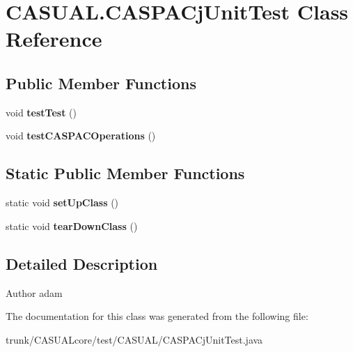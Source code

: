 \hypertarget{class_c_a_s_u_a_l_1_1_c_a_s_p_a_cj_unit_test}{\section{C\-A\-S\-U\-A\-L.\-C\-A\-S\-P\-A\-Cj\-Unit\-Test Class Reference}
\label{class_c_a_s_u_a_l_1_1_c_a_s_p_a_cj_unit_test}
}
\subsection*{Public Member Functions}
\begin{DoxyCompactItemize}
\item 
\hypertarget{class_c_a_s_u_a_l_1_1_c_a_s_p_a_cj_unit_test_a181266dbfe86e6615b438cce55e520ad}{void {\bfseries test\-Test} ()}\label{class_c_a_s_u_a_l_1_1_c_a_s_p_a_cj_unit_test_a181266dbfe86e6615b438cce55e520ad}

\item 
\hypertarget{class_c_a_s_u_a_l_1_1_c_a_s_p_a_cj_unit_test_a5970d891918d6e696f949f1cd8d838e6}{void {\bfseries test\-C\-A\-S\-P\-A\-C\-Operations} ()}\label{class_c_a_s_u_a_l_1_1_c_a_s_p_a_cj_unit_test_a5970d891918d6e696f949f1cd8d838e6}

\end{DoxyCompactItemize}
\subsection*{Static Public Member Functions}
\begin{DoxyCompactItemize}
\item 
\hypertarget{class_c_a_s_u_a_l_1_1_c_a_s_p_a_cj_unit_test_a567c4df41861b0f66301e81a4fa80d1e}{static void {\bfseries set\-Up\-Class} ()}\label{class_c_a_s_u_a_l_1_1_c_a_s_p_a_cj_unit_test_a567c4df41861b0f66301e81a4fa80d1e}

\item 
\hypertarget{class_c_a_s_u_a_l_1_1_c_a_s_p_a_cj_unit_test_aae59acf2bb710e6a7b0a4b8aec5f53a2}{static void {\bfseries tear\-Down\-Class} ()}\label{class_c_a_s_u_a_l_1_1_c_a_s_p_a_cj_unit_test_aae59acf2bb710e6a7b0a4b8aec5f53a2}

\end{DoxyCompactItemize}


\subsection{Detailed Description}
\begin{DoxyAuthor}{Author}
adam 
\end{DoxyAuthor}


The documentation for this class was generated from the following file\-:\begin{DoxyCompactItemize}
\item 
trunk/\-C\-A\-S\-U\-A\-Lcore/test/\-C\-A\-S\-U\-A\-L/C\-A\-S\-P\-A\-Cj\-Unit\-Test.\-java\end{DoxyCompactItemize}
